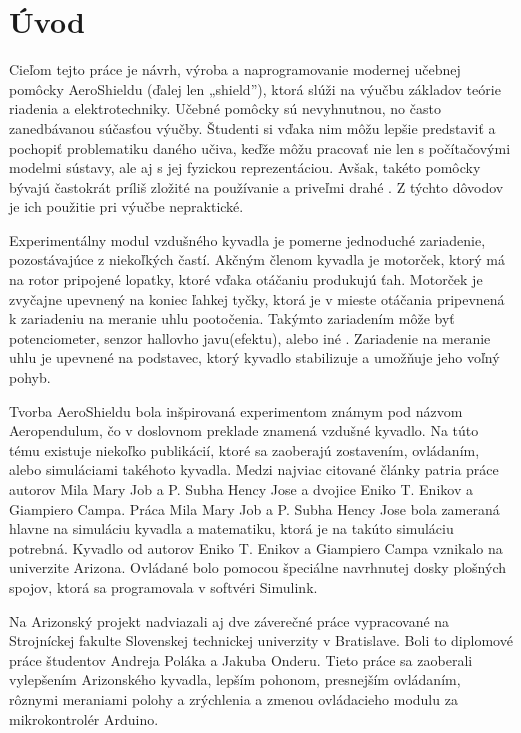 \chapter*{Úvod}
\label{UVOD}

Cieľom tejto práce je návrh, výroba a naprogramovanie modernej učebnej pomôcky AeroShieldu (ďalej len „shield”), ktorá slúži na výučbu základov teórie riadenia a elektrotechniky. Učebné pomôcky sú nevyhnutnou, no často zanedbávanou súčasťou výučby. Študenti si vďaka nim môžu lepšie predstaviť a pochopiť problematiku daného učiva, keďže môžu pracovať nie len s počítačovými modelmi sústavy, ale aj s jej fyzickou reprezentáciou. Avšak, takéto pomôcky bývajú častokrát príliš zložité na používanie a priveľmi drahé \cite{Hor}. Z týchto dôvodov je ich použitie pri výučbe nepraktické.
 
Experimentálny modul vzdušného kyvadla je pomerne jednoduché zariadenie, pozostávajúce z niekoľkých častí. Akčným členom kyvadla je motorček, ktorý má na rotor pripojené lopatky, ktoré vďaka otáčaniu produkujú ťah. Motorček je zvyčajne upevnený na koniec ľahkej tyčky, ktorá je v mieste otáčania pripevnená k zariadeniu na meranie uhlu pootočenia. Takýmto zariadením môže byť potenciometer, senzor hallovho javu(efektu), alebo iné \cite{senzor}. Zariadenie na meranie uhlu je upevnené na podstavec, ktorý kyvadlo stabilizuje a umožňuje jeho voľný pohyb. 
 
Tvorba AeroShieldu bola inšpirovaná experimentom známym pod názvom Aeropendulum, čo v doslovnom preklade znamená vzdušné kyvadlo. Na túto tému existuje niekoľko publikácií, ktoré sa zaoberajú zostavením, ovládaním, alebo simuláciami takéhoto kyvadla. Medzi najviac citované články patria práce autorov Mila Mary Job a P. Subha Hency Jose\cite{7192959} a dvojice Eniko T. Enikov a Giampiero Campa\cite{enikov_campa_2012}. Práca Mila Mary Job a P. Subha Hency Jose bola zameraná hlavne na simuláciu kyvadla a matematiku, ktorá je na takúto simuláciu potrebná. Kyvadlo od autorov Eniko T. Enikov a Giampiero Campa vznikalo na univerzite Arizona. Ovládané bolo pomocou špeciálne navrhnutej dosky plošných spojov, ktorá sa programovala v softvéri Simulink. 

Na Arizonský projekt nadviazali aj dve záverečné práce vypracované na Strojníckej fakulte Slovenskej technickej univerzity v Bratislave. Boli to diplomové práce študentov Andreja Poláka\cite{Polakk} a Jakuba Onderu\cite{onderkaaa}. Tieto práce sa zaoberali vylepšením Arizonského kyvadla, lepším pohonom, presnejším ovládaním, rôznymi meraniami polohy a zrýchlenia a zmenou ovládacieho modulu za mikrokontrolér Arduino.

